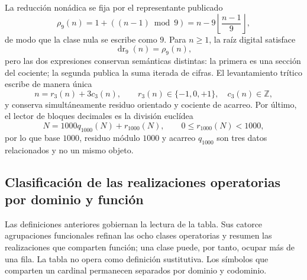 La reducción nonádica se fija por el representante publicado
\begin{equation}
 \rho_9(n)=1+((n-1)\bmod 9)
 =n-9\left\lfloor\frac{n-1}{9}\right\rfloor,
 \label{eq:rho9-construida-tpk-rev11}
\end{equation}
de modo que la clase nula se escribe como \(9\). Para \(n\geq1\), la raíz
digital satisface
\[
 \operatorname{dr}_9(n)=\rho_9(n),
\]
pero las dos expresiones conservan semánticas distintas: la primera es una
sección del cociente; la segunda publica la suma iterada de cifras. El levantamiento
trítico escribe de manera única
\begin{equation}
 n=r_3(n)+3c_3(n),
 \qquad r_3(n)\in\{-1,0,+1\},\quad c_3(n)\in\mathbb Z,
 \label{eq:lift-mod3-tpk-rev11}
\end{equation}
y conserva simultáneamente residuo orientado y cociente de acarreo. Por
último, el lector de bloques decimales es la división euclídea
\begin{equation}
 N=1000q_{1000}(N)+r_{1000}(N),
 \qquad 0\leq r_{1000}(N)<1000,
 \label{eq:lector-mod1000-tpk-rev11}
\end{equation}
por lo que base \(1000\), residuo módulo \(1000\) y acarreo \(q_{1000}\)
son tres datos relacionados y no un mismo objeto.

\subsection{Clasificación de las realizaciones operatorias por dominio y función}

Las definiciones anteriores gobiernan la lectura de la tabla. Sus catorce
agrupaciones funcionales refinan las ocho clases operatorias y resumen las
realizaciones que comparten función; una clase puede, por tanto, ocupar más
de una fila. La tabla no opera como definición sustitutiva. Los símbolos que
comparten un cardinal permanecen separados por dominio y codominio.

